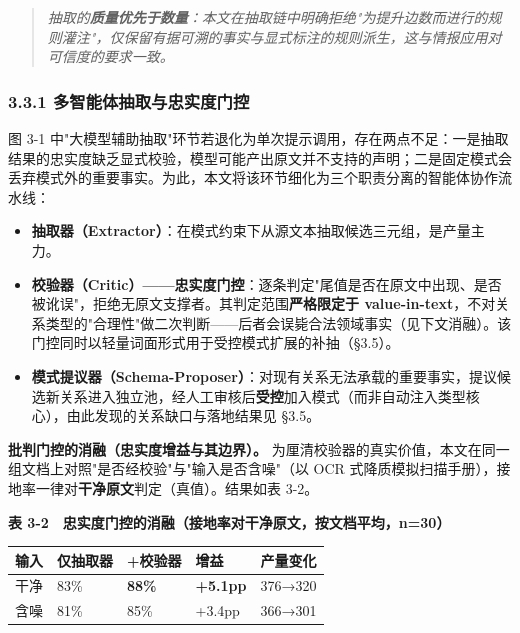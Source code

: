 \documentclass[12pt,a4paper]{ctexart}
\begin{document}
\begin{quote}\itshape 抽取的\textbf{质量优先于数量}：本文在抽取链中明确拒绝"为提升边数而进行的规则灌注"，仅保留有据可溯的事实与显式标注的规则派生，这与情报应用对可信度的要求一致。\end{quote}

\subsubsection*{3.3.1 多智能体抽取与忠实度门控}

图 3-1 中"大模型辅助抽取"环节若退化为单次提示调用，存在两点不足：一是抽取结果的忠实度缺乏显式校验，模型可能产出原文并不支持的声明；二是固定模式会丢弃模式外的重要事实。为此，本文将该环节细化为三个职责分离的智能体协作流水线：

\begin{itemize}[leftmargin=2em]
\item \textbf{抽取器（Extractor）}：在模式约束下从源文本抽取候选三元组，是产量主力。
\item \textbf{校验器（Critic）——忠实度门控}：逐条判定"尾值是否在原文中出现、是否被讹误"，拒绝无原文支撑者。其判定范围\textbf{严格限定于 value-in-text}，不对关系类型的"合理性"做二次判断——后者会误毙合法领域事实（见下文消融）。该门控同时以轻量词面形式用于受控模式扩展的补抽（§3.5）。
\item \textbf{模式提议器（Schema-Proposer）}：对现有关系无法承载的重要事实，提议候选新关系进入独立池，经人工审核后\textbf{受控}加入模式（而非自动注入类型核心），由此发现的关系缺口与落地结果见 §3.5。
\end{itemize}

\textbf{批判门控的消融（忠实度增益与其边界）。} 为厘清校验器的真实价值，本文在同一组文档上对照"是否经校验"与"输入是否含噪"（以 OCR 式降质模拟扫描手册），接地率一律对\textbf{干净原文}判定（真值）。结果如表 3-2。

\textbf{表 3-2　忠实度门控的消融（接地率对干净原文，按文档平均，n=30）}

\begin{center}\small
\begin{tabular}{|p{}|p{}|p{}|p{}|p{}|}
\hline
\textbf{输入} & \textbf{仅抽取器} & \textbf{+校验器} & \textbf{增益} & \textbf{产量变化} \\ \hline
干净 & 83\% & \textbf{88\%} & \textbf{+5.1pp} & 376→320 \\ \hline
含噪 & 81\% & 85\% & +3.4pp & 366→301 \\ \hline
\end{tabular}
\end{center}
\end{document}
